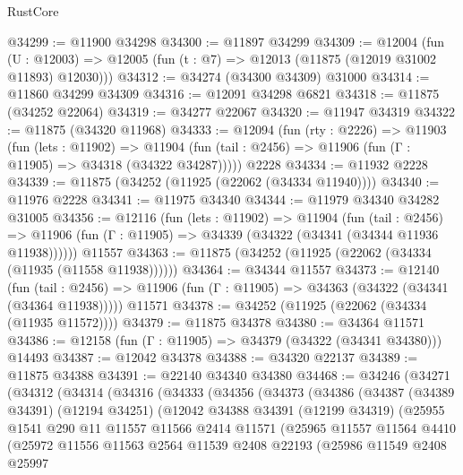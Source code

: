 \begin{lexlean}{RustCore}
\begin{coremodule}
@34299 := @11900 @34298
@34300 := @11897 @34299
@34309 := @12004
    (fun (U : @12003) => @12005 (fun (t : @7) => @12013 (@11875 (@12019 @31002 @11893) @12030)))
@34312 := @34274 (@34300 @34309) @31000
@34314 := @11860 @34299 @34309
@34316 := @12091 @34298 @6821
@34318 := @11875 (@34252 @22064)
@34319 := @34277 @22067
@34320 := @11947 @34319
@34322 := @11875 (@34320 @11968)
@34333 := @12094
    (fun (rty : @2226) =>
    @11903
      (fun (lets : @11902) =>
      @11904 (fun (tail : @2456) => @11906 (fun (Γ : @11905) => @34318 (@34322 @34287)))))
    @2228
@34334 := @11932 @2228
@34339 := @11875 (@34252 (@11925 (@22062 (@34334 @11940))))
@34340 := @11976 @2228
@34341 := @11975 @34340
@34344 := @11979 @34340 @34282 @31005
@34356 := @12116
    (fun (lets : @11902) =>
    @11904
      (fun (tail : @2456) =>
      @11906 (fun (Γ : @11905) => @34339 (@34322 (@34341 (@34344 @11936 @11938))))))
    @11557
@34363 := @11875 (@34252 (@11925 (@22062 (@34334 (@11935 (@11558 @11938))))))
@34364 := @34344 @11557
@34373 := @12140
    (fun (tail : @2456) => @11906 (fun (Γ : @11905) => @34363 (@34322 (@34341 (@34364 @11938)))))
    @11571
@34378 := @34252 (@11925 (@22062 (@34334 (@11935 @11572))))
@34379 := @11875 @34378
@34380 := @34364 @11571
@34386 := @12158 (fun (Γ : @11905) => @34379 (@34322 (@34341 @34380))) @14493
@34387 := @12042 @34378
@34388 := @34320 @22137
@34389 := @11875 @34388
@34391 := @22140 @34340 @34380
@34468 := @34246
    (@34271
      (@34312
        (@34314
          (@34316
            (@34333
              (@34356
                (@34373
                  (@34386
                    (@34387
                      (@34389 @34391)
                      (@12194 @34251)
                      (@12042
                        @34388
                        @34391
                        (@12199 @34319)
                        (@25955
                          @1541
                          @290
                          @11
                          @11557
                          @11566
                          @2414
                          @11571
                          (@25965
                            @11557
                            @11564
                            @4410
                            (@25972
                              @11556
                              @11563
                              @2564
                              @11539
                              @2408
                              @22193
                              (@25986
                                @11549
                                @2408
                                @25997

\end{coremodule}
\end{lexlean}
